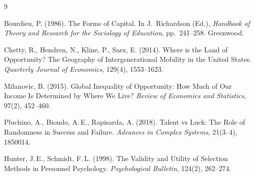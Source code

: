 \documentclass[12pt,a4paper]{article}
\begin{document}
\begin{thebibliography}{9}

 Bourdieu, P. (1986). The Forms of Capital. In J.~Richardson (Ed.), \textit{Handbook of Theory and Research for the Sociology of Education}, pp.~241--258. Greenwood.

 Chetty, R., Hendren, N., Kline, P., Saez, E. (2014). Where is the Land of Opportunity? The Geography of Intergenerational Mobility in the United States. \textit{Quarterly Journal of Economics}, 129(4), 1553--1623.

 Milanovic, B. (2015). Global Inequality of Opportunity: How Much of Our Income Is Determined by Where We Live? \textit{Review of Economics and Statistics}, 97(2), 452--460.

 Pluchino, A., Biondo, A.\,E., Rapisarda, A. (2018). Talent vs Luck: The Role of Randomness in Success and Failure. \textit{Advances in Complex Systems}, 21(3--4), 1850014.

 Hunter, J.\,E., Schmidt, F.\,L. (1998). The Validity and Utility of Selection Methods in Personnel Psychology. \textit{Psychological Bulletin}, 124(2), 262--274.

\end{thebibliography}
\end{document}
